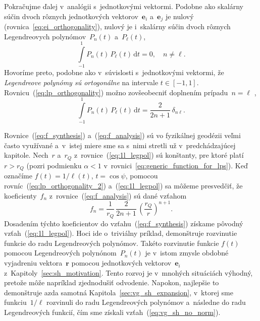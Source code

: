 \documentclass[a4paper, 12pt]{book}
\newcommand{\diff}{\mathrm d}
\let\vec\mathbf
\begin{document}
Pokračujme ďalej v~analógii s~jednotkovými vektormi.  Podobne ako skalárny 
súčin dvoch rôznych jednotkových vektorov~$\vec e_i$ a~$ \vec e_j$ je nulový 
(rovnica~\ref{eq:ei_orthogonality}), nulový je i~skalárny súčin dvoch rôznych 
Legendreovych polynómov~$P_n(t)$ a~$P_\ell(t)$,
%
\begin{equation}
\label{eq:lp_orthogonality}
\int\limits_{-1}^1 P_n(t) \, P_\ell(t) \, \diff t = 0{,} \quad n \neq \ell{.}
\end{equation}
%
Hovoríme preto, podobne ako v~súvislosti s~jednotkovými vektormi, že
\emph{Legendreove polynómy sú ortogonálne} na intervale $t \in [-1, 1].$
Rovnicu~(\ref{eq:lp_orthogonality}) možno zovšeobecniť doplnením prípadu~$n
= \ell$ \parencite[napríklad][]{Hobson},
%
\begin{equation}
\label{eq:lp_orthogonality_2}
\int\limits_{-1}^1 P_n(t) \, P_\ell(t) \, \diff t = \frac{2}{2n + 1} \, 
\delta_{n\ell}{.}
\end{equation}

Rovnice~(\ref{eq:f_synthesis}) a~(\ref{eq:f_analysis}) sú vo fyzikálnej
geodézii veľmi často využívané a~v~istej miere sme sa s~nimi stretli už
v~predchádzajúcej kapitole.  Nech~$r$ a~$r_Q$ z~rovnice~(\ref{eq:1l_legpol}) sú 
konštanty, pre ktoré platí~$r > r_Q$ (pozri podmienku
$\alpha < 1$ v~rovnici~\ref{eq:generic_function_for_lps}).  Keď označíme $f(t)
= 1 \slash \ell(t)$, $t = \cos\psi$, pomocou 
rovníc~(\ref{eq:lp_orthogonality_2})
a~(\ref{eq:1l_legpol}) sa môžeme presvedčiť, že koeficienty~$f_n$
z~rovnice~(\ref{eq:f_analysis}) sú dané vzťahom
%
\begin{equation}
f_n = \frac{1}{r_Q} \, \frac{2}{2n + 1} \, \left( \frac{r_Q}{r} \right)^{n
+ 1}{.}
\end{equation}
%
Dosadením týchto koeficientov do vzťahu~(\ref{eq:f_synthesis}) získame pôvodný 
vzťah~(\ref{eq:1l_legpol}).  Hoci ide o~triviálny príklad, demonštruje 
rozvinutie funkcie do radu Legendreových polynómov.  Takéto rozvinutie funkcie 
$f(t)$ pomocou Legendreových polynónom~$P_n(t)$ je v~istom zmysle obdobné 
vyjadreniu vektora~$\vec r$ pomocou jednotkových vektorov~$\vec e_i$ 
z~Kapitoly~\ref{sec:sh_motivation}.  Tento rozvoj je v~mnohých situáciách 
výhodný, pretože môže napríklad zjednodušiť odvodenie.  Napokon, najlepšie to 
demonštruje azda samotná Kapitola~\ref{sec:vg_sh_expansion}, v~ktorej sme 
funkciu~$1 \slash \ell$ rozvinuli do radu Legendreových polynómov a~následne do 
radu Legendreových funkcií, čím sme získali vzťah~(\ref{eq:vg_sh_no_norm}).
\end{document}
